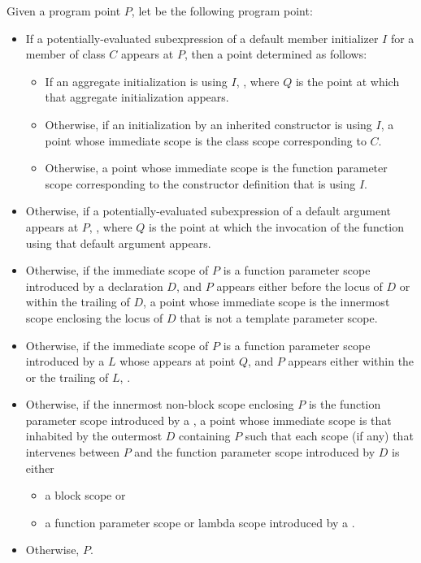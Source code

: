 \begin{itemdescr}
\pnum
Given a program point $P$,
let  be the following program point:
\begin{itemize}
\item
  If a potentially-evaluated subexpression
  of a default member initializer $I$
  for a member of class $C$
  appears at $P$,
  then a point determined as follows:
  \begin{itemize}
  \item
    If an aggregate initialization is using $I$,
    ,
    where $Q$ is the point at which that aggregate initialization appears.
  \item
    Otherwise, if an initialization
    by an inherited constructor is using $I$,
    a point whose immediate scope is the class scope corresponding to $C$.
  \item
    Otherwise, a point whose immediate scope
    is the function parameter scope
    corresponding to the constructor definition that is using $I$.
  \end{itemize}
  \item
    Otherwise, if a potentially-evaluated subexpression
    of a default argument appears at $P$,
    ,
    where $Q$ is the point at which the invocation of the function
    using that default argument appears.
  \item
    Otherwise, if the immediate scope of $P$
    is a function parameter scope introduced by a declaration $D$,
    and $P$ appears either before the locus of $D$
    or within the trailing  of $D$,
    a point whose immediate scope is the innermost scope enclosing the locus of $D$
    that is not a template parameter scope.
  \item
    Otherwise, if the immediate scope of $P$
    is a function parameter scope
    introduced by a  $L$
    whose  appears at point $Q$,
    and $P$ appears either within the 
    or the trailing  of $L$,
    .
  \item
    Otherwise, if the innermost non-block scope enclosing $P$
    is the function parameter scope
    introduced by a ,
    a point whose immediate scope is that inhabited
    by the outermost  $D$
    containing $P$ such that each scope (if any) that intervenes between $P$
    and the function parameter scope introduced by $D$ is either
    \begin{itemize}
    \item
      a block scope or
    \item
      a function parameter scope or lambda scope
      introduced by a .
    \end{itemize}
  \item
    Otherwise, $P$.
\end{itemize}


\end{itemdescr}

